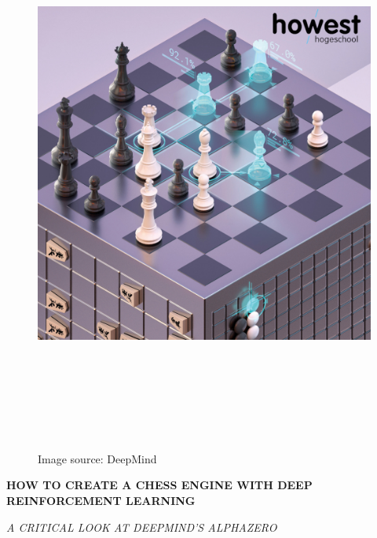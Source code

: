 \documentclass{article}
\begin{document}
\begin{titlepage}
    \begin{figure}[H]
        \centering
        \includegraphics[width=18.5cm,height=18.5cm]{img/titlepage-cover.png}
        \caption{Image source: DeepMind {\cite{AlphaZeroSheddingNew}}}
    \end{figure}
    \begin{adjustwidth}{1.5cm}{1.5cm}

    \vspace{0.5em}

    \MakeUppercase{\Huge\textbf{How to create a chess engine with Deep Reinforcement Learning}}

    \MakeUppercase{\Large\textit{A critical look at DeepMind's AlphaZero}}

    \vspace{1em}


\end{adjustwidth}
\end{titlepage}
\end{document}
